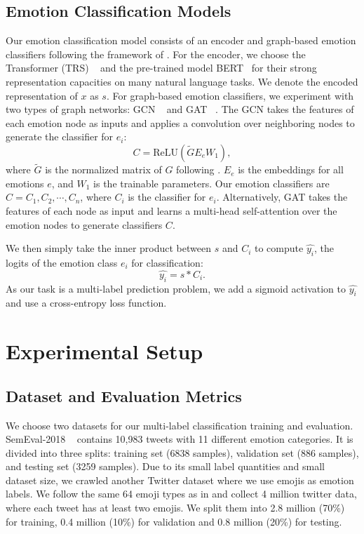 \documentclass[11pt,a4paper]{article}
\begin{document}
\subsection{Emotion Classification Models}
Our emotion classification model consists of an encoder and graph-based emotion classifiers following the framework of \citet{chen2019multi}. For the encoder, we choose the Transformer (TRS) ~\cite{vaswani2017attention} and the pre-trained model BERT~\cite{devlin2019bert} for their strong representation capacities on many natural language tasks. We denote the encoded representation of $x$ as $s$. For graph-based emotion classifiers, we experiment with two types of graph networks: GCN ~\cite{kipf2016semi} and GAT ~\cite{velivckovic2017graph}. The GCN takes the features of each emotion node as inputs and applies a convolution over neighboring nodes to generate the classifier for $e_i$:
\begin{equation}
    C = \text{ReLU}(\tilde{G} E_e W_1), \label{eq4}
\end{equation}
where $\tilde{G}$ is the normalized matrix of $G$ following \citet{kipf2016semi}. $E_e$ is the embeddings for all emotions $e$, and $W_1$ is the trainable parameters. Our emotion classifiers are $C = {C_1, C_2, \cdots, C_n}$, where $C_i$ is the classifier for $e_i$. Alternatively, GAT takes the features of each node as input and learns a multi-head self-attention over the emotion nodes to generate classifiers $C$.


We then simply take the inner product between $s$ and $C_i$ to compute $\hat{y_i} $, the logits of the emotion class $e_i$ for classification:
\begin{equation}
    \hat{y_i}  = s * C_i.
    \label{yi}
\end{equation}
As our task is a multi-label prediction problem, we add a sigmoid activation to  $\hat{y_i}$ and use a cross-entropy loss function.





\section{Experimental Setup}
\subsection{Dataset and Evaluation Metrics}
We choose two datasets for our multi-label classification training and evaluation. SemEval-2018 ~\cite{mohammad2018semeval} contains 10,983 tweets with 11 different emotion categories. It is divided into three splits: training set (6838 samples), validation set (886 samples), and testing set (3259 samples). Due to its small label quantities and small dataset size, we crawled another Twitter dataset where we use emojis as emotion labels. We follow the same 64 emoji types as in \citet{felbo2017using} and collect 4 million twitter data, where each tweet has at least two emojis. We split them into 2.8 million (70\%) for training, 0.4 million (10\%) for validation and 0.8 million (20\%) for testing. 
\end{document}
